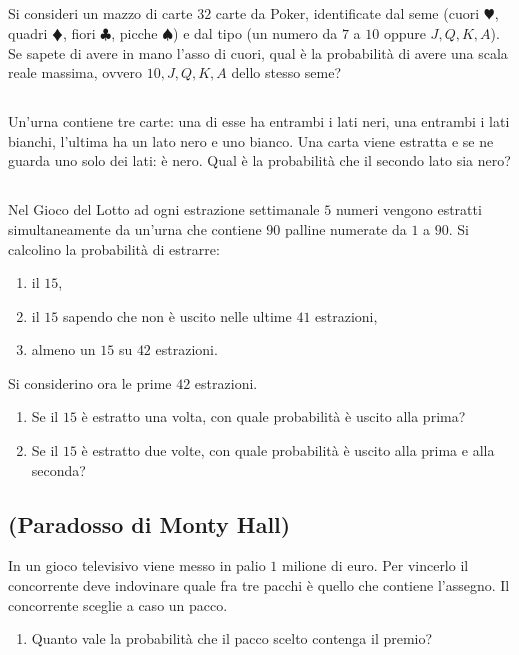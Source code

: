 \subsection{}

Si consideri un mazzo di carte $32$ carte da Poker, identificate dal seme (cuori $\varheartsuit $, quadri $\vardiamondsuit $, fiori $\clubsuit $, picche $\spadesuit $) e dal tipo (un numero da $7$ a $10$ oppure $J,Q,K,A$). Se sapete di avere in mano l'asso di cuori, qual è la probabilità di avere una scala reale massima, ovvero $10,J,Q,K,A$ dello stesso seme?
\subsection{}

Un'urna contiene tre carte: una di esse ha entrambi i lati neri, una entrambi i lati bianchi, l'ultima ha un lato nero e uno bianco. Una carta viene estratta e se ne guarda uno solo dei lati: è nero. Qual è la probabilità che il secondo lato sia nero?
\subsection{}

Nel Gioco del Lotto ad ogni estrazione settimanale $5$ numeri vengono estratti simultaneamente da un'urna che contiene $90$ palline numerate da $1$ a $90$. Si calcolino la probabilità di estrarre:
\begin{enumerate}
\item il $15$,
\item il $15$ sapendo che non è uscito nelle ultime $41$ estrazioni,
\item almeno un $15$ su $42$ estrazioni.
\end{enumerate}

Si considerino ora le prime $42$ estrazioni.
\begin{enumerate}
\item Se il $15$ è estratto una volta, con quale probabilità è uscito alla prima?
\item Se il $15$ è estratto due volte, con quale probabilità è uscito alla prima e alla seconda?
\end{enumerate}
\subsection{(Paradosso di Monty Hall)}

In un gioco televisivo viene messo in palio $1$ milione di euro. Per vincerlo il concorrente deve indovinare quale fra tre pacchi è quello che contiene l'assegno. Il concorrente sceglie a caso un pacco.
\begin{enumerate}
\item Quanto vale la probabilità che il pacco scelto contenga il premio?
\end{enumerate}

